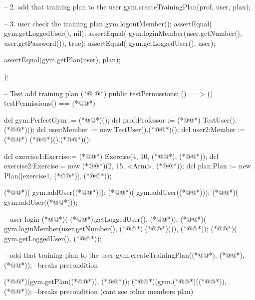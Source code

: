\begin{vdmpp}[breaklines=true]
  -- 2. add that training plan to the user
  gym.createTrainingPlan(prof, user, plan);
  
  -- 3. user check the training plan
   gym.logoutMember();
   assertEqual( gym.getLoggedUser(), nil); 
   assertEqual( gym.loginMember(user.getNumber(), user.getPassword()), true);
   assertEqual( gym.getLoggedUser(), user);
   
   assertEqual(gym.getPlan(user), plan);
  
 );
 
 -- Test add training plan
(*@
\label{testPermissions:406}
@*)
 public testPermissions: () ==> ()
 testPermissions() == (*@\vdmnotcovered{(}@*)
  
  dcl gym:PerfectGym := (*@@*)();
  dcl prof:Professor := (*@@*) TestUser().(*@@*)();  
  dcl user:Member := new TestUser().(*@@*)(); 
   dcl user2:Member := (*@@*) (*@@*)().(*@@*)(); 
   
  dcl exercise1:Exercise:= (*@@*) Exercise(4, 10, (*@@*), (*@@*));
  dcl exercise2:Exercise:= new (*@@*)(2, 15, <Arm>, (*@@*));
  dcl plan:Plan := new Plan([exercise1, (*@@*)], (*@@*));
  
  (*@@*)( gym.addUser((*@@*)));
  (*@@*)( gym.addUser((*@@*)));
  (*@@*)( gym.addUser((*@@*)));
  
  -- user login
  (*@@*)( (*@@*).getLoggedUser(), (*@@*)); 
   (*@@*)( gym.loginMember(user.getNumber(), (*@@*).(*@@*)()), (*@@*));
   (*@@*)( gym.getLoggedUser(), (*@@*));
  
  -- add that training plan to the user
  gym.createTrainingPlan((*@@*), (*@@*), (*@@*)); --breaks precondition
  
   (*@@*)(gym.getPlan((*@@*)), (*@@*));
   (*@@*)(gym.(*@@*)((*@@*)), (*@@*)); --breaks precondition (cant see other members plan)
  

\end{vdmpp}
